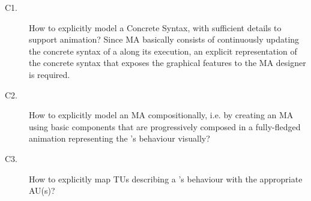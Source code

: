 \begin{description}
   \item[C1.] How to explicitly model a Concrete Syntax, with sufficient details
   to support animation? Since MA basically consists of continuously updating the
   concrete syntax of a \DSL along its execution, an explicit representation of the
   concrete syntax that exposes the graphical features to the MA designer is 
   required.
   
   \item[C2.] How to explicitly model an MA compositionally, i.e. by creating an
   MA using basic components that are progressively composed in a fully-fledged
   animation representing the \DSL's behaviour visually? 
   
   \item[C3.] How to explicitly map TUs describing a \DSL's behaviour with the
   appropriate AU(s)? 
\end{description}
